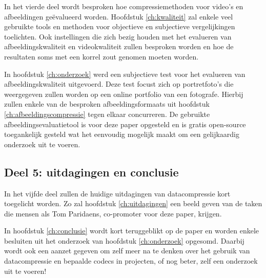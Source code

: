 In het vierde deel wordt besproken hoe compressiemethoden voor video's en afbeeldingen geëvalueerd worden. Hoofdstuk \ref{ch:kwaliteit} zal enkele veel gebruikte tools en methoden voor objectieve en subjectieve vergelijkingen toelichten. Ook instellingen die zich bezig houden met het evalueren van afbeeldingskwaliteit en videokwaliteit zullen besproken worden en hoe de resultaten soms met een korrel zout genomen moeten worden.

In hoofdstuk \ref{ch:onderzoek} werd een subjectieve test voor het evalueren van afbeeldingskwaliteit uitgevoerd. Deze test focust zich op portretfoto's die weergegeven zullen worden op een online portfolio van een fotografe. Hierbij zullen enkele van de besproken \glspl{afbeeldingsformaat} uit hoofdstuk \ref{ch:afbeeldingscompressie} tegen elkaar concurreren. De gebruikte \gls{afbeeldingsevaluatietool} is voor deze paper opgesteld en is gratis \gls{open-source} toegankelijk gesteld wat het eenvoudig mogelijk maakt om een gelijkaardig onderzoek uit te voeren.

\subsection{Deel 5: uitdagingen en conclusie}
\label{sec:opzet-bachelorproef-deel-5}

In het vijfde deel zullen de huidige uitdagingen van \gls{datacompressie} kort toegelicht worden. Zo zal hoofdstuk \ref{ch:uitdagingen} een beeld geven van de taken die mensen als Tom Paridaens, co-promoter voor deze paper, krijgen.

In hoofdstuk \ref{ch:conclusie} wordt kort teruggeblikt op de paper en worden enkele besluiten uit het onderzoek van hoofdstuk \ref{ch:onderzoek} opgesomd. Daarbij wordt ook een aanzet gegeven om zelf meer na te denken over het gebruik van \gls{datacompressie} en bepaalde  \glspl{codec} in projecten, of nog beter, zelf een onderzoek uit te voeren!
